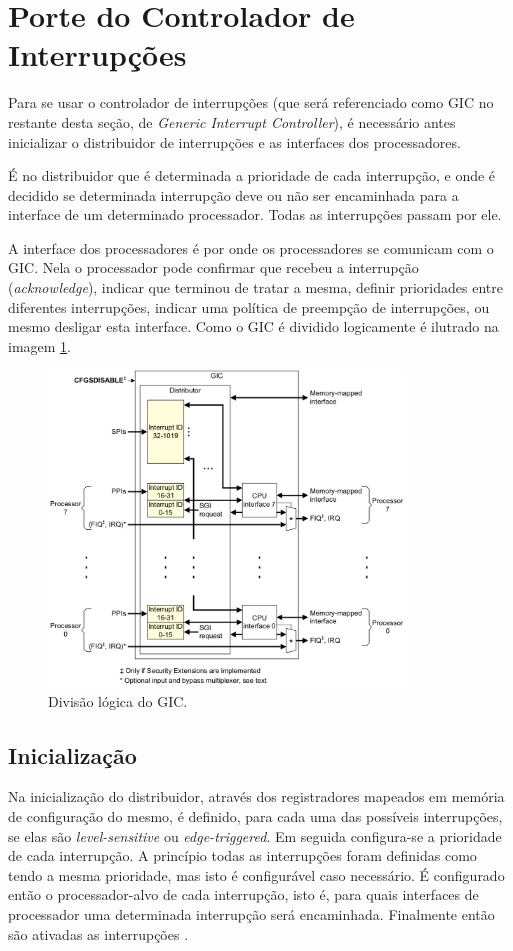 \section{Porte do Controlador de Interrupções}

Para se usar o controlador de interrupções (que será referenciado como GIC no restante desta seção, de \emph{Generic Interrupt Controller}), é necessário antes inicializar o distribuidor de interrupções e as interfaces dos processadores.

É no distribuidor que é determinada a prioridade de cada interrupção, e onde é decidido se determinada interrupção deve ou não ser encaminhada para a interface de um determinado processador. Todas as interrupções passam por ele.

A interface dos processadores é por onde os processadores se comunicam com o GIC. Nela o processador pode confirmar que recebeu a interrupção (\emph{acknowledge}), indicar que terminou de tratar a mesma, definir prioridades entre diferentes interrupções, indicar uma política de preempção de interrupções, ou mesmo desligar esta interface. Como o GIC é dividido logicamente é ilutrado na imagem \ref{img:gic}.

\begin{figure}[ht!]
    \centering
    \includegraphics[width=9.5cm]{figuras/gic}
    \caption{Divisão lógica do GIC.}
    \label{img:gic}
\end{figure}

\subsection{Inicialização}

Na inicialização do distribuidor, através dos registradores mapeados em memória de configuração do mesmo, é definido, para cada uma das possíveis interrupções, se elas são \emph{level-sensitive} ou \emph{edge-triggered}.
Em seguida configura-se a prioridade de cada interrupção. A princípio todas as interrupções foram definidas como tendo a mesma prioridade, mas isto é configurável caso necessário.
É configurado então o processador-alvo de cada interrupção, isto é, para quais interfaces de processador uma determinada interrupção será encaminhada. Finalmente então são ativadas as interrupções \cite{gic}.

